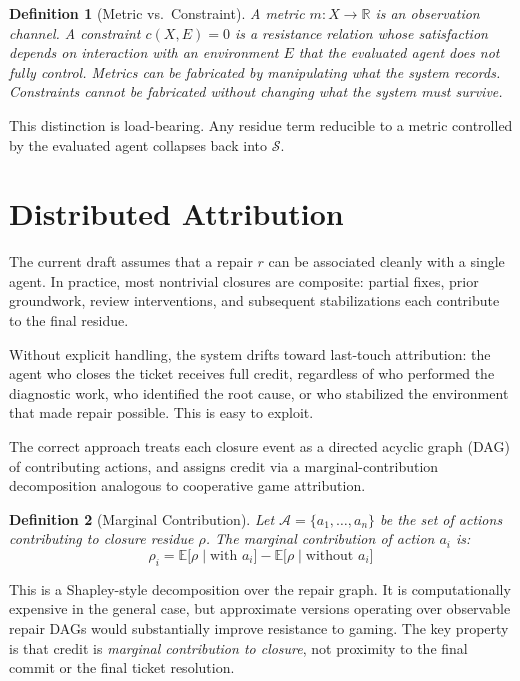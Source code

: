 \documentclass[12pt]{article}
\newtheorem{definition}{Definition}
\begin{document}
\begin{definition}[Metric vs.\ Constraint]
A \emph{metric} $m : X \to \mathbb{R}$ is an observation channel. A
\emph{constraint} $c(X, E) = 0$ is a resistance relation whose
satisfaction depends on interaction with an environment $E$ that the
evaluated agent does not fully control. Metrics can be fabricated by
manipulating what the system records. Constraints cannot be fabricated
without changing what the system must survive.
\end{definition}

This distinction is load-bearing. Any residue term reducible to a metric
controlled by the evaluated agent collapses back into $\mathcal{S}$.

\section{Distributed Attribution}

The current draft assumes that a repair $r$ can be associated cleanly
with a single agent. In practice, most nontrivial closures are
composite: partial fixes, prior groundwork, review interventions, and
subsequent stabilizations each contribute to the final residue.

Without explicit handling, the system drifts toward last-touch
attribution: the agent who closes the ticket receives full credit,
regardless of who performed the diagnostic work, who identified the root
cause, or who stabilized the environment that made repair possible. This
is easy to exploit.

The correct approach treats each closure event as a directed acyclic
graph (DAG) of contributing actions, and assigns credit via a
marginal-contribution decomposition analogous to cooperative game
attribution.

\begin{definition}[Marginal Contribution]
Let $\mathcal{A} = \{a_1, \ldots, a_n\}$ be the set of actions
contributing to closure residue $\rho$. The marginal contribution of
action $a_i$ is:
\[
  \rho_i =
    \mathbb{E}\bigl[\rho \mid \text{with } a_i\bigr]
    - \mathbb{E}\bigl[\rho \mid \text{without } a_i\bigr]
\]
\end{definition}

This is a Shapley-style decomposition over the repair graph. It is
computationally expensive in the general case, but approximate versions
operating over observable repair DAGs would substantially improve
resistance to gaming. The key property is that credit is \emph{marginal
contribution to closure}, not proximity to the final commit or the final
ticket resolution.
\end{document}
